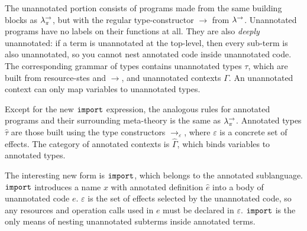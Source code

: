 The unannotated portion consists of programs made from the same building blocks as $\lambda^{\rightarrow}_{\pi}$, but with the regular type-constructor $\rightarrow$ from $\lambda^{\rightarrow}$. Unannotated programs have no labels on their functions at all. They are also \textit{deeply} unannotated: if a term is unannotated at the top-level, then every sub-term is also unannotated, so you cannot nest annotated code inside unannotated code. The corresponding grammar of types contains unannotated types $\tau$, which are built from resource-stes and $\rightarrow$, and unannotated contexts $\Gamma$. An unannotated context can only map variables to unannotated types.

Except for the new $\mathtt{import}$ expression, the analogous rules for annotated programs and their surrounding meta-theory is the same as $\lambda^{\rightarrow}_{\pi}$. Annotated types $\hat \tau$ are those built using the type constructors $\rightarrow_{\varepsilon}$, where $\varepsilon$ is a concrete set of effects. The category of annotated contexts is $\hat \Gamma$, which binds variables to annotated types.

The interesting new form is $\mathtt{import}$, which belongs to the annotated sublanguage. $\mathtt{import}$ introduces a name $x$ with annotated definition $\hat e$ into a body of unannotated code $e$. $\varepsilon$ is the set of effects selected by the unannotated code, so any resources and operation calls used in $e$ must be declared in $\varepsilon$. $\mathtt{import}$ is the only means of nesting unannotated subterms inside annotated terms.

